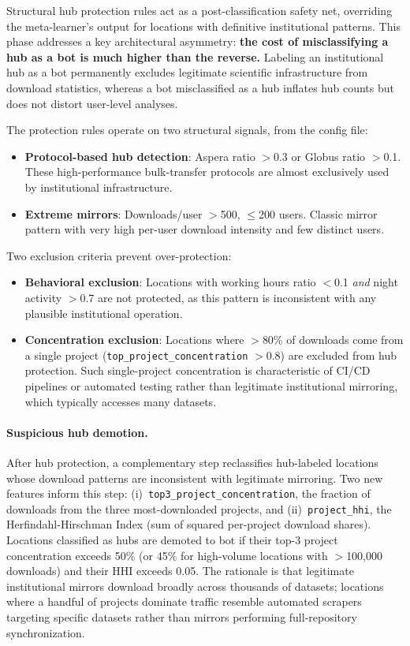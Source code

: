 \documentclass[11pt,a4paper]{article}
\begin{document}
Structural hub protection rules act as a post-classification safety net, overriding the meta-learner's output for locations with definitive institutional patterns. This phase addresses a key architectural asymmetry: \textbf{the cost of misclassifying a hub as a bot is much higher than the reverse.} Labeling an institutional hub as a bot permanently excludes legitimate scientific infrastructure from download statistics, whereas a bot misclassified as a hub inflates hub counts but does not distort user-level analyses.

The protection rules operate on two structural signals, from the config file:

\begin{itemize}
    \item \textbf{Protocol-based hub detection}: Aspera ratio $>$0.3 or Globus ratio $>$0.1. These high-performance bulk-transfer protocols are almost exclusively used by institutional infrastructure.
    \item \textbf{Extreme mirrors}: Downloads/user $>$500, $\leq$200 users. Classic mirror pattern with very high per-user download intensity and few distinct users.
\end{itemize}

\noindent Two exclusion criteria prevent over-protection:
\begin{itemize}
    \item \textbf{Behavioral exclusion}: Locations with working hours ratio $<$0.1 \emph{and} night activity $>$0.7 are not protected, as this pattern is inconsistent with any plausible institutional operation.
    \item \textbf{Concentration exclusion}: Locations where $>$80\% of downloads come from a single project (\texttt{top\_project\_concentration} $>$0.8) are excluded from hub protection. Such single-project concentration is characteristic of CI/CD pipelines or automated testing rather than legitimate institutional mirroring, which typically accesses many datasets.
\end{itemize}

\paragraph{Suspicious hub demotion.} After hub protection, a complementary step reclassifies hub-labeled locations whose download patterns are inconsistent with legitimate mirroring. Two new features inform this step: (i)~\texttt{top3\_project\_concentration}, the fraction of downloads from the three most-downloaded projects, and (ii)~\texttt{project\_hhi}, the Herfindahl-Hirschman Index (sum of squared per-project download shares). Locations classified as hubs are demoted to bot if their top-3 project concentration exceeds 50\% (or 45\% for high-volume locations with $>$100,000 downloads) and their HHI exceeds 0.05. The rationale is that legitimate institutional mirrors download broadly across thousands of datasets; locations where a handful of projects dominate traffic resemble automated scrapers targeting specific datasets rather than mirrors performing full-repository synchronization.
\end{document}
